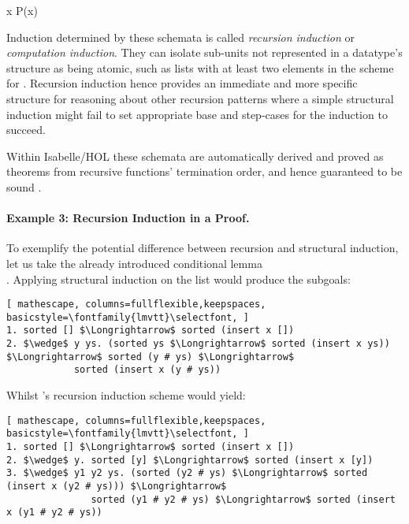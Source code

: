   {\forall x \;\; P\;(x)}

\vspace{2 mm}

Induction determined by these schemata is called \emph{recursion induction} or \emph{computation induction}.
%
They can isolate sub-units not represented in a datatype's structure as being atomic, such as lists with at least two elements in the scheme for .
%
Recursion induction hence provides an immediate and more specific structure for reasoning about other recursion patterns where a simple structural induction might fail to set appropriate base and step-cases for the induction to succeed.

Within Isabelle/HOL these schemata are automatically derived and proved as theorems from recursive functions' termination order, and hence guaranteed to be sound \cite{krauss-term}. 


\paragraph*{Example 3: Recursion Induction in a Proof.}


To exemplify the potential difference between recursion and structural induction, let us take the already introduced conditional lemma \\ .
%
Applying structural induction on the list  would produce the subgoals:

\begin{lstlisting}[ mathescape, columns=fullflexible,keepspaces, basicstyle=\fontfamily{lmvtt}\selectfont, ]
1. sorted [] $\Longrightarrow$ sorted (insert x [])
2. $\wedge$ y ys. (sorted ys $\Longrightarrow$ sorted (insert x ys)) $\Longrightarrow$ sorted (y # ys) $\Longrightarrow$
            sorted (insert x (y # ys))
\end{lstlisting}

\noindent Whilst 's recursion induction scheme would yield:

\begin{lstlisting}[ mathescape, columns=fullflexible,keepspaces, basicstyle=\fontfamily{lmvtt}\selectfont, ]
1. sorted [] $\Longrightarrow$ sorted (insert x [])
2. $\wedge$ y. sorted [y] $\Longrightarrow$ sorted (insert x [y])
3. $\wedge$ y1 y2 ys. (sorted (y2 # ys) $\Longrightarrow$ sorted (insert x (y2 # ys))) $\Longrightarrow$ 
               sorted (y1 # y2 # ys) $\Longrightarrow$ sorted (insert x (y1 # y2 # ys))
\end{lstlisting}

